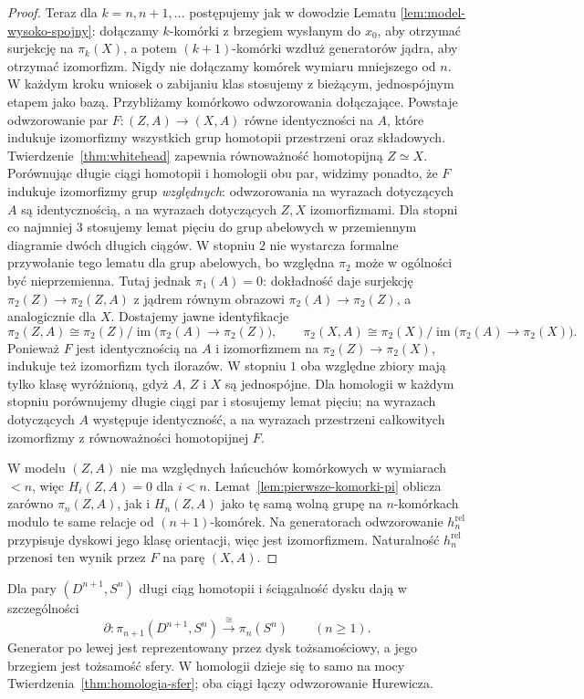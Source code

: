 \begin{proof}
Teraz dla $k=n,n+1,\ldots$
postępujemy jak w
dowodzie Lematu
\ref{lem:model-wysoko-spojny}:
dołączamy $k$-komórki
z brzegiem wysłanym
do $x_0$, aby
otrzymać surjekcję
na $\pi_k(X)$,
a potem
$(k+1)$-komórki
wzdłuż generatorów
jądra, aby
otrzymać izomorfizm.
Nigdy nie dołączamy
komórek wymiaru
mniejszego od $n$.
W każdym kroku wniosek o zabijaniu klas stosujemy z bieżącym,
jednospójnym etapem jako bazą. Przybliżamy komórkowo odwzorowania dołączające.
Powstaje odwzorowanie par $F:(Z,A)\to(X,A)$
równe identyczności na $A$, które
indukuje izomorfizmy
wszystkich grup
homotopii przestrzeni
oraz składowych.
Twierdzenie~\ref{thm:whitehead}
zapewnia równoważność
homotopijną $Z\simeq X$.
Porównując długie ciągi
homotopii i homologii
obu par, widzimy
ponadto, że $F$
indukuje izomorfizmy
grup \emph{względnych}:
odwzorowania na wyrazach dotyczących $A$ są identycznością,
a na wyrazach dotyczących $Z,X$ izomorfizmami.
Dla stopni co najmniej $3$ stosujemy lemat pięciu do grup
abelowych w przemiennym diagramie dwóch długich ciągów.
W stopniu $2$ nie wystarcza formalne przywołanie
tego lematu dla grup abelowych, bo względna $\pi_2$
może w ogólności być nieprzemienna.
Tutaj jednak $\pi_1(A)=0$: dokładność daje surjekcję
$\pi_2(Z)\to\pi_2(Z,A)$ z jądrem równym obrazowi
$\pi_2(A)\to\pi_2(Z)$, a analogicznie dla $X$.
Dostajemy jawne identyfikacje
\[
 \pi_2(Z,A)\cong
 \pi_2(Z)/\operatorname{im}\bigl(\pi_2(A)\to\pi_2(Z)\bigr),
 \qquad
 \pi_2(X,A)\cong
 \pi_2(X)/\operatorname{im}\bigl(\pi_2(A)\to\pi_2(X)\bigr).
\]
Ponieważ $F$ jest identycznością na $A$
i izomorfizmem na $\pi_2(Z)\to\pi_2(X)$,
indukuje też izomorfizm tych ilorazów.
W stopniu $1$ oba względne zbiory mają tylko klasę
wyróżnioną, gdyż $A$, $Z$ i $X$ są jednospójne.
Dla homologii w każdym stopniu porównujemy
długie ciągi par i stosujemy lemat pięciu;
na wyrazach dotyczących $A$ występuje identyczność,
a na wyrazach przestrzeni całkowitych izomorfizmy
z równoważności homotopijnej $F$.

W modelu $(Z,A)$
nie ma względnych
łańcuchów komórkowych
w wymiarach $<n$,
więc $H_i(Z,A)=0$
dla $i<n$.
Lemat~\ref{lem:pierwsze-komorki-pi}
oblicza zarówno
$\pi_n(Z,A)$,
jak i $H_n(Z,A)$
jako tę samą
wolną grupę na
$n$-komórkach
modulo te same
relacje od
$(n+1)$-komórek.
Na generatorach
odwzorowanie $h_n^{\mathrm{rel}}$
przypisuje dyskowi
jego klasę orientacji,
więc jest izomorfizmem.
Naturalność
$h_n^{\mathrm{rel}}$
przenosi ten wynik
przez $F$
na parę $(X,A)$.
\end{proof}

\begin{przyklad}
\label{prz:pi-dysk-brzeg}
Dla pary $(D^{n+1},S^n)$
długi ciąg homotopii
i ściągalność dysku
dają w szczególności
\[
 \partial:
 \pi_{n+1}(D^{n+1},S^n)
 \xrightarrow{\ \cong\ }
 \pi_n(S^n)
 \qquad(n\geq1).
\]
Generator po lewej jest reprezentowany przez dysk tożsamościowy,
a jego brzegiem jest
tożsamość sfery.
W homologii dzieje się
to samo na mocy
Twierdzenia~\ref{thm:homologia-sfer};
oba ciągi łączy odwzorowanie
Hurewicza.
\end{przyklad}

